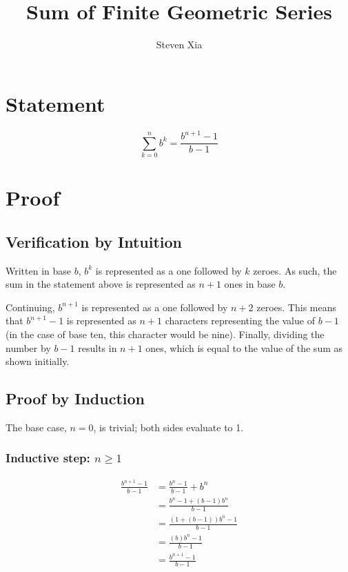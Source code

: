 \documentclass{article}
\title{Sum of Finite Geometric Series}
\author{Steven Xia}
\begin{document}
\maketitle

\section{Statement}
$$\sum_{k=0}^n b^k = \frac{b^{n+1} - 1}{b - 1}$$

\section{Proof}

\subsection{Verification by Intuition}
Written in base $b$, $b^k$ is represented as a one followed by $k$ zeroes.
As such, the sum in the statement above is represented as $n+1$ ones in base $b$.

Continuing, $b^{n+1}$ is represented as a one followed by $n+2$ zeroes.
This means that $b^{n+1} - 1$ is represented as $n+1$ characters representing the value of $b - 1$ (in the case of base ten, this character would be nine).
Finally, dividing the number by $b-1$ results in $n+1$ ones, which is equal to the value of the sum as shown initially.

\subsection{Proof by Induction}

The base case, $n=0$, is trivial; both sides evaluate to 1.

\subsubsection{Inductive step: $n\geq1$}
\begin{align}
    \frac{b^{n+1} - 1}{b - 1} &= \frac{b^n - 1}{b - 1} + b^n \\
                              &= \frac{b^n - 1 + (b - 1)b^n}{b - 1} \\
                              &= \frac{(1 + (b - 1))b^n - 1}{b - 1} \\
                              &= \frac{(b)b^n - 1}{b - 1} \\
                              &= \frac{b^{n+1} - 1}{b - 1}
\end{align}
\end{document}
